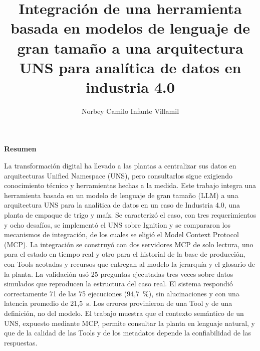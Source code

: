 \documentclass[stu, 12pt, letterpaper, donotrepeattitle, floatsintext]{apa7}
\title{\Large Integración de una herramienta basada en modelos de lenguaje de gran tamaño a una arquitectura UNS para analítica de datos en industria 4.0}
\author{Norbey Camilo Infante Villamil}
\affiliation{Universidad Industrial de Santander}
\begin{document}
\pagestyle{myheadings}







\renewcommand\contentsname{\largeÍndice}
\tableofcontents
\setcounter{tocdepth}{2}
\newpage
\renewcommand{\listfigurename}{\largeÍndice de fíguras}
\listoffigures
\newpage
\renewcommand{\listtablename}{\largeÍndice de tablas}
\listoftables
\newpage


\begin{center}
    {\large \textbf{Resumen}}
\end{center}
\justify
La transformación digital ha llevado a las plantas a centralizar sus datos en arquitecturas Unified Namespace (UNS), pero consultarlos sigue exigiendo conocimiento técnico y herramientas hechas a la medida. Este trabajo integra una herramienta basada en un modelo de lenguaje de gran tamaño (LLM) a una arquitectura UNS para la analítica de datos en un caso de Industria 4.0, una planta de empaque de trigo y maíz. Se caracterizó el caso, con tres requerimientos y ocho desafíos, se implementó el UNS sobre Ignition y se compararon los mecanismos de integración, de los cuales se eligió el Model Context Protocol (MCP). La integración se construyó con dos servidores MCP de solo lectura, uno para el estado en tiempo real y otro para el historial de la base de producción, con Tools acotadas y recursos que entregan al modelo la jerarquía y el glosario de la planta. La validación usó 25 preguntas ejecutadas tres veces sobre datos simulados que reproducen la estructura del caso real. El sistema respondió correctamente 71 de las 75 ejecuciones (94,7~\%), sin alucinaciones y con una latencia promedio de 21,5~s. Los errores provinieron de una Tool y de una definición, no del modelo. El trabajo muestra que el contexto semántico de un UNS, expuesto mediante MCP, permite consultar la planta en lenguaje natural, y que de la calidad de las Tools y de los metadatos depende la confiabilidad de las respuestas.
\end{document}
